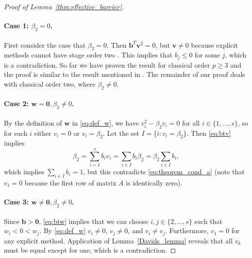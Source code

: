 \begin{proof}[Proof of Lemma~\ref{thm:effective_barrier}]
	\paragraph{Case 1: $\beta_2 = 0$.}
	First consider the case that $\beta_2 = 0$. 
	Then $\bm{b}^T\bm{v}^2 = 0$, but $\bm{v }\neq 0$ because explicit methods
	cannot have stage order two \cite{Ruuth2002}. This implies that $b_j \leq 0$ 
	for some $j$, which is a contradiction.
	So far we have proven the result for classical order $p \ge 3$ 
	and the proof is similar to the result mentioned in \cite{Ruuth2002}. 
	The remainder of our proof deals with classical order two, 
	where $\beta_2 \neq 0$.

	\paragraph{Case 2: $\bm{w} = \bm{0}, \beta_2\ne0$.}
	By the definition of $\bm{w}$ in \eqref{eq:def_w}, we have $v_i^2 - \beta_2 v_i = 0$ 
	for all $i \in \{1, \dots, s\}$, 	so for each $i$ either $v_i = 0$ or $v_i = \beta_2$.
	Let the set $I = \{i : v_i = \beta_2\}$. 
	Then \eqref{eq:btv} implies 
	\begin{equation*}
            \beta_2 = \sum_{i=1}^s b_i v_i = \sum_{i \in I}b_i\beta_2 = \beta_2\sum_{i \in I}b_i,
	\end{equation*}
        which implies $\sum_{i\in I} b_i = 1$, but this contradicts \eqref{eq:theorem_cond_a}
	(note that $v_1 = 0$ because the first row of matrix $A$ is identically zero).

	\paragraph{Case 3: $\bm{w} \neq \bm{0}, \beta_2\ne0$.}
	Since $\bm{b} > \bm{0}$, \eqref{eq:btw} implies that we can choose
	$i, j \in \{2, \dots, s\}$ such that $w_i < 0 < w_j$.
        By \eqref{eq:def_w} $v_i\ne 0$, $v_j\ne 0$, and $v_i\ne v_j$.  Furthermore,
        $v_1=0$ for any explicit method.
        Application of Lemma~\ref{Davids_lemma} reveals that all $v_k$ must
        be equal except for one, which is a contradiction.

\end{proof}
